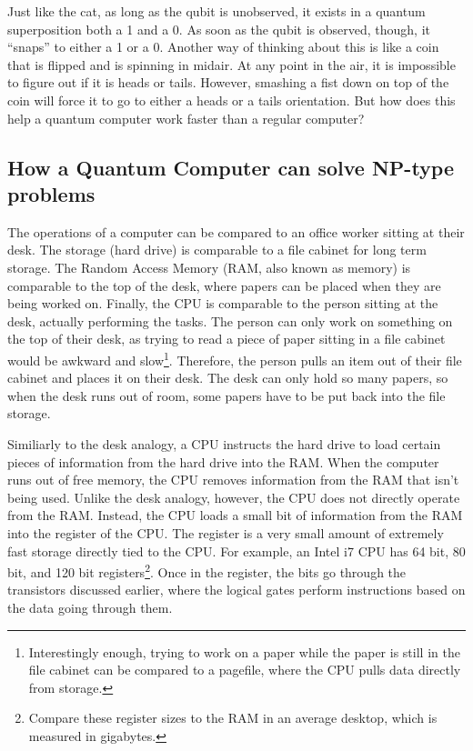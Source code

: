 \documentclass[10pt,journal,compsoc]{IEEEtran}
\begin{document}
Just like the cat, as long as the qubit is unobserved, it exists in a quantum superposition both a 1 and a 0. As soon as the qubit is observed, though, it ``snaps'' to either a 1 or a 0. Another way of thinking about this is like a coin that is flipped and is  spinning in midair. At any point in the air, it is impossible to figure out if it is heads or tails. However, smashing a fist down on top of the coin will force it to go to either a heads or a tails orientation. But how does this help a quantum computer work faster than a regular computer?



\subsection{How a Quantum Computer can solve NP-type problems}

The operations of a computer can be compared to an office worker sitting at their desk. The storage (hard drive) is comparable to a file cabinet for long term storage. The Random Access Memory (RAM, also known as memory) is comparable to the top of the desk, where papers can be placed when they are being worked on. Finally, the CPU is comparable to the person sitting at the desk, actually performing the tasks. The person can only work on something on the top of their desk, as trying to read a piece of paper sitting in a file cabinet would be awkward and slow\footnote{Interestingly enough, trying to work on a paper while the paper is still in the file cabinet can be compared to a pagefile, where the CPU pulls data directly from storage.}. Therefore, the person pulls an item out of their file cabinet and places it on their desk. The desk can only hold so many papers, so when the desk runs out of room, some papers have to be put back into the file storage. 




Similiarly to the desk analogy, a CPU instructs the hard drive to load certain pieces of information from the hard drive into the RAM. When the computer runs out of free memory, the CPU removes information from the RAM that isn't being used. Unlike the desk analogy, however, the CPU does not directly operate from the RAM. Instead, the CPU loads a small bit of information from the RAM into the register of the CPU. The register is a very small amount of extremely fast storage directly tied to the CPU. For example, an Intel i7 CPU has 64 bit, 80 bit, and 120 bit registers\footnote{Compare these register sizes to the RAM in an average desktop, which is measured in gigabytes.}. Once in the register, the bits go through the transistors discussed earlier, where the logical gates perform instructions based on the data going through them\cite{THPHYS}\cite{Explain}.
\end{document}
